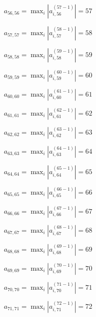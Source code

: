 \documentclass[a4paper,12pt]{article}
\begin{document}
$a _{ 56, 56 } =  \max _i |a _{ i, 56 } ^{ (57 - 1) } | = 57$

$a _{ 57, 57 } =  \max _i |a _{ i, 57 } ^{ (58 - 1) } | = 58$

$a _{ 58, 58 } =  \max _i |a _{ i, 58 } ^{ (59 - 1) } | = 59$

$a _{ 59, 59 } =  \max _i |a _{ i, 59 } ^{ (60 - 1) } | = 60$

$a _{ 60, 60 } =  \max _i |a _{ i, 60 } ^{ (61 - 1) } | = 61$

$a _{ 61, 61 } =  \max _i |a _{ i, 61 } ^{ (62 - 1) } | = 62$

$a _{ 62, 62 } =  \max _i |a _{ i, 62 } ^{ (63 - 1) } | = 63$

$a _{ 63, 63 } =  \max _i |a _{ i, 63 } ^{ (64 - 1) } | = 64$

$a _{ 64, 64 } =  \max _i |a _{ i, 64 } ^{ (65 - 1) } | = 65$

$a _{ 65, 65 } =  \max _i |a _{ i, 65 } ^{ (66 - 1) } | = 66$

$a _{ 66, 66 } =  \max _i |a _{ i, 66 } ^{ (67 - 1) } | = 67$

$a _{ 67, 67 } =  \max _i |a _{ i, 67 } ^{ (68 - 1) } | = 68$

$a _{ 68, 68 } =  \max _i |a _{ i, 68 } ^{ (69 - 1) } | = 69$

$a _{ 69, 69 } =  \max _i |a _{ i, 69 } ^{ (70 - 1) } | = 70$

$a _{ 70, 70 } =  \max _i |a _{ i, 70 } ^{ (71 - 1) } | = 71$

$a _{ 71, 71 } =  \max _i |a _{ i, 71 } ^{ (72 - 1) } | = 72$
\end{document}
